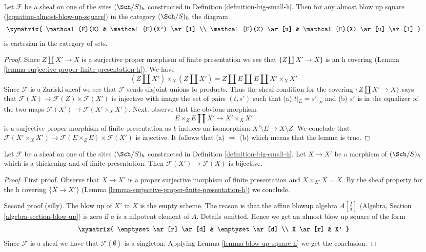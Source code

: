 \begin{lemma}
\label{lemma-blow-up-square-h}
Let $\mathcal{F}$ be a sheaf on one of the sites $(\Sch/S)_h$
constructed in Definition \ref{definition-big-small-h}.
Then for any almost blow up square (\ref{equation-almost-blow-up-square})
in the category $(\Sch/S)_h$ the diagram
$$
\xymatrix{
\mathcal{F}(E) & \mathcal{F}(X') \ar[l] \\
\mathcal{F}(Z) \ar[u] & \mathcal{F}(X) \ar[u] \ar[l]
}
$$
is cartesian in the category of sets.
\end{lemma}

\begin{proof}
Since $Z \amalg X' \to X$ is a surjective proper morphism
of finite presentation we see that $\{Z \amalg X' \to X\}$ is an h
covering (Lemma \ref{lemma-surjective-proper-finite-presentation-h}).
We have
$$
(Z \amalg X') \times_X (Z \amalg X') =
Z \amalg E \amalg E \amalg X' \times_X X'
$$
Since $\mathcal{F}$ is a Zariski sheaf we see that
$\mathcal{F}$ sends disjoint unions to products.
Thus the sheaf condition for the covering
$\{Z \amalg X' \to X\}$ says that
$\mathcal{F}(X) \to \mathcal{F}(Z) \times \mathcal{F}(X')$
is injective with image the set of pairs $(t, s')$ such that
(a) $t|_E = s'|_E$ and (b) $s'$ is in the equalizer of the two maps
$\mathcal{F}(X') \to \mathcal{F}(X' \times_X X')$.
Next, observe that the obvious morphism
$$
E \times_Z E \amalg X' \longrightarrow X' \times_X X'
$$
is a surjective proper morphism of finite presentation as $b$ induces
an isomorphism $X' \setminus E \to X \setminus Z$. We conclude that
$\mathcal{F}(X' \times_X X') \to
\mathcal{F}(E \times_Z E) \times \mathcal{F}(X')$ is injective.
It follows that (a) $\Rightarrow$ (b) which means that the lemma is true.
\end{proof}

\begin{lemma}
\label{lemma-thickening-h}
Let $\mathcal{F}$ be a sheaf on one of the sites $(\Sch/S)_h$
constructed in Definition \ref{definition-big-small-h}.
Let $X \to X'$ be a morphism of $(\Sch/S)_h$ which is
a thickening and of finite presentation. Then
$\mathcal{F}(X') \to \mathcal{F}(X)$ is bijective.
\end{lemma}

\begin{proof}
First proof. Observe that $X \to X'$ is a proper surjective morphism of
finite presentation and $X \times_{X'} X = X$.
By the sheaf property for the h covering $\{X \to X'\}$
(Lemma \ref{lemma-surjective-proper-finite-presentation-h})
we conclude.

\medskip\noindent
Second proof (silly). The blow up of $X'$ in $X$ is the empty scheme.
The reason is that the affine blowup algebra $A[\frac{I}{a}]$
(Algebra, Section \ref{algebra-section-blow-up})
is zero if $a$ is a nilpotent element of $A$. Details omitted.
Hence we get an almost blow up square of the form
$$
\xymatrix{
\emptyset \ar[r] \ar[d] & \emptyset \ar[d] \\
X \ar[r] & X'
}
$$
Since $\mathcal{F}$ is a sheaf we have that $\mathcal{F}(\emptyset)$
is a singleton.
Applying Lemma \ref{lemma-blow-up-square-h} we get the conclusion.
\end{proof}


